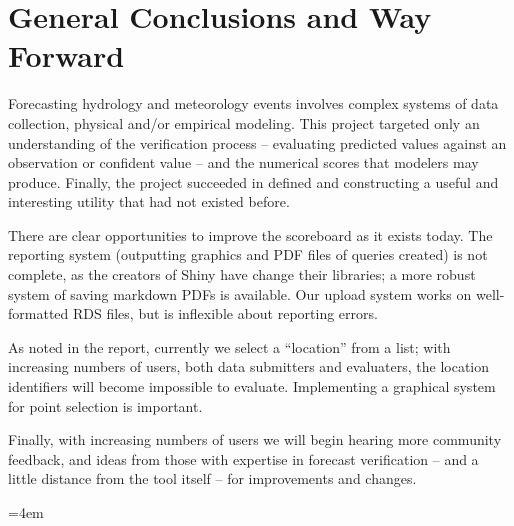 \documentclass[logos,parttoc,morelanguage=french,morelanguage=german,draft]{orsay-memoire}
\begin{document}

\strut\newpage


\part{General Conclusions and Way Forward}

Forecasting hydrology and meteorology events involves complex systems of data collection, physical and/or empirical modeling. This project targeted only an understanding of the verification process -- evaluating predicted values against an observation or confident value -- and the numerical scores that modelers may produce. Finally, the project succeeded in defined and constructing a useful and interesting utility that had not existed before.

There are clear opportunities to improve the scoreboard as it exists today. The reporting system (outputting graphics and PDF files of queries created) is not complete, as the creators of Shiny have change their libraries; a more robust system of saving markdown PDFs is available. Our upload system works on well-formatted RDS files, but is inflexible about reporting errors.

As noted in the report, currently we select a ``location'' from a list; with increasing numbers of users, both data submitters and evaluaters, the location identifiers will become impossible to evaluate. Implementing a graphical system for point selection is important. 

Finally, with increasing numbers of users we will begin hearing more community feedback, and ideas from those with expertise in forecast verification -- and a little distance from the tool itself -- for improvements and changes.



\thispagestyle{empty}
\strut\newpage


\begin{thebibliography}{100}
	=4em
	\addtolength\leftskip{25pt}
	\setlength{}
	\addtolength\parskip{\smallskipamount}
\printbibliography 

\end{thebibliography}

\end{document}
